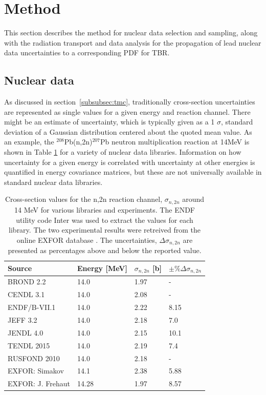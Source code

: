 \FloatBarrier

\FloatBarrier
\section{Method}
This section describes the method for nuclear data selection and sampling, along with the radiation transport and data analysis for the propagation of lead nuclear data uncertainties to a corresponding PDF for TBR.

\subsection{Nuclear data}
\label{subsec:data}
As discussed in section~\ref{subsubsec:tmc}, traditionally cross-section uncertainties are represented as single values for a given energy and reaction channel. There might be an estimate of uncertainty, which is typically given as a 1 $\sigma$, standard deviation of a Gaussian distribution centered about the quoted mean value. As an example, the $^{208}$Pb(n,2n)$^{207}$Pb neutron multiplication reaction at 14MeV is shown in Table \ref{tab:lead_by_lib} for a variety of nuclear data libraries. Information on how uncertainty for a given energy is correlated with uncertainty at other energies is quantified in energy covariance matrices, but these are not universally available in standard nuclear data libraries.

\begin{table}[H]
  \footnotesize
  \centering
  \begin{tabularx}{\textwidth}{XXXX}
    \toprule
    Source & Energy [MeV] & $\sigma_{n,2n}$ [b] & $\pm\%\Delta\sigma_{n,2n}$ \\
    \midrule
    BROND 2.2 & 14.0 & 1.97 & - \\
    CENDL 3.1 & 14.0 & 2.08 & - \\
    ENDF/B-VII.1 & 14.0 & 2.22 & 8.15 \\
    JEFF 3.2 & 14.0 & 2.18 & 7.0 \\
    JENDL 4.0 & 14.0 & 2.15 & 10.1 \\
    TENDL 2015 & 14.0 & 2.19 & 7.4 \\
    RUSFOND 2010 & 14.0 & 2.18 & - \\
    EXFOR: Simakov & 14.1 & 2.38 & 5.88 \\
    EXFOR: J. Frehaut & 14.28 & 1.97 & 8.57 \\
    \bottomrule
  \end{tabularx}
  \caption{Cross-section values for the n,2n reaction channel, $\sigma_{n,2n}$ around 14 MeV for various libraries and experiments. The ENDF utility code Inter \cite{Dunford2002} was used to extract the values for each library. The two experimental results were retreived from the online EXFOR database \cite{exfor2017}. The uncertainties, $\Delta\sigma_{n,2n}$ are presented as percentages above and below the reported value.}
  \label{tab:lead_by_lib}
\end{table}

